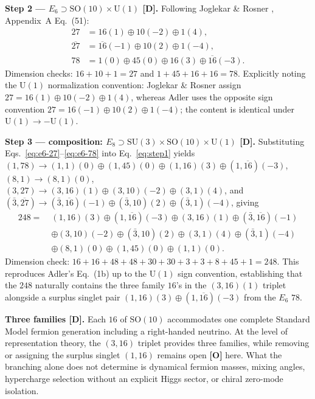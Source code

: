 \documentclass[11pt]{article}
\begin{document}
\noindent\textbf{Step 2 --- $E_6 \supset \mathrm{SO}(10) \times \mathrm{U}(1)$ [D].} Following Joglekar \& Rosner \cite{joglekar-rosner}, Appendix~A Eq.~(51):
\begin{align}
27 &= 16(1) \oplus 10(-2) \oplus 1(4), \label{eq:e6-27} \\
\overline{27} &= \overline{16}(-1) \oplus 10(2) \oplus 1(-4), \label{eq:e6-27bar} \\
78 &= 1(0) \oplus 45(0) \oplus 16(3) \oplus \overline{16}(-3). \label{eq:e6-78}
\end{align}
Dimension checks: $16 + 10 + 1 = 27$ and $1 + 45 + 16 + 16 = 78$. Explicitly noting the $\mathrm{U}(1)$ normalization convention: Joglekar \& Rosner assign $27 = 16(1) \oplus 10(-2) \oplus 1(4)$, whereas Adler \cite{adler} uses the opposite sign convention $27 = 16(-1) \oplus 10(2) \oplus 1(-4)$; the content is identical under $\mathrm{U}(1) \to -\mathrm{U}(1)$.

\noindent\textbf{Step 3 --- composition: $E_8 \supset \mathrm{SU}(3) \times \mathrm{SO}(10) \times \mathrm{U}(1)$ [D].} Substituting Eqs.~\eqref{eq:e6-27}--\eqref{eq:e6-78} into Eq.~\eqref{eq:step1} yields $(1,78) \to (1,1)(0) \oplus (1,45)(0) \oplus (1,16)(3) \oplus (1,\overline{16})(-3)$, $(8,1) \to (8,1)(0)$, $(3,27) \to (3,16)(1) \oplus (3,10)(-2) \oplus (3,1)(4)$, and $(\bar{3},\overline{27}) \to (\bar{3},\overline{16})(-1) \oplus (\bar{3},10)(2) \oplus (\bar{3},1)(-4)$, giving
\begin{equation}
\label{eq:step3}
\begin{aligned}
248 =\;& (1,16)(3) \oplus (1,\overline{16})(-3) \oplus (3,16)(1) \oplus (\bar{3},\overline{16})(-1) \\
& \oplus (3,10)(-2) \oplus (\bar{3},10)(2) \oplus (3,1)(4) \oplus (\bar{3},1)(-4) \\
& \oplus (8,1)(0) \oplus (1,45)(0) \oplus (1,1)(0).
\end{aligned}
\end{equation}
Dimension check: $16 + 16 + 48 + 48 + 30 + 30 + 3 + 3 + 8 + 45 + 1 = 248$. This reproduces Adler's Eq.~(1b) \cite{adler} up to the $\mathrm{U}(1)$ sign convention, establishing that the $248$ naturally contains the three family $16$'s in the $(3,16)(1)$ triplet alongside a surplus singlet pair $(1,16)(3) \oplus (1,\overline{16})(-3)$ from the $E_6$ $78$.

\noindent\textbf{Three families [D].} Each $16$ of $\mathrm{SO}(10)$ accommodates one complete Standard Model fermion generation including a right-handed neutrino. At the level of representation theory, the $(3,16)$ triplet provides three families, while removing or assigning the surplus singlet $(1,16)$ remains open \textbf{[O]} here. What the branching alone does not determine is dynamical fermion masses, mixing angles, hypercharge selection without an explicit Higgs sector, or chiral zero-mode isolation.
\end{document}
